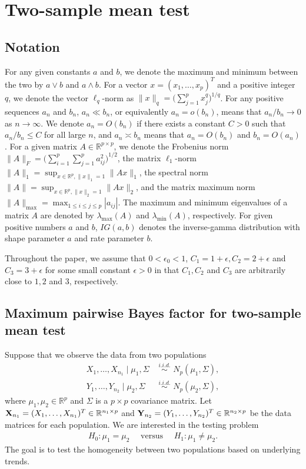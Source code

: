 \documentclass[11pt]{article}
\newcommand{\bean}{\begin{eqnarray}}
\newcommand{\eean}{\end{eqnarray}}
\newcommand{\bfX}{{\bf X}}
\newcommand{\bfY}{{\bf Y}}
\newcommand{\sg}{\Sigma}
\newcommand{\lra}{\longrightarrow}
\newcommand{\bbR}{\mathbb{R}}
\begin{document}
\section{Two-sample mean test}\label{sec:mean}

\subsection{Notation}\label{subsec:notation}

For any given constants $a$ and $b$, we denote the maximum and minimum between the two by $a\vee b$ and $a\wedge b$.
For a vector $x=(x_1,\ldots, x_p)^T$ and a positive integer $q$, we denote the vector $\ell_q$-norm as $\|x\|_q = \big(\sum_{j=1}^p x_j^q \big)^{1/q}$.
For any positive sequences $a_n$ and $b_n$, $a_n\ll b_n$, or equivalently $a_n = o(b_n)$, means that $a_n /b_n \lra 0$ as $n\to\infty$.
We denote $a_n= O(b_n)$ if there exists a constant $C>0$ such that $a_n/b_n \le C$ for all large $n$, and $a_n\asymp b_n$ means that $a_n=O(b_n)$ and $b_n = O(a_n)$.
For a given matrix $A\in \bbR^{p\times p}$, we denote the Frobenius norm $\|A\|_F = \big( \sum_{i=1}^p \sum_{j=1}^p a_{ij}^2 \big)^{1/2}$, the matrix $\ell_1$-norm  $\|A\|_1 = \sup_{x\in \bbR^p , \|x\|_1=1 } \|Ax\|_1$, the spectral norm $\|A\| = \sup_{x\in \bbR^p , \|x\|_2=1 }\|Ax\|_2$, and the matrix maximum norm $\|A\|_{\max} = \max_{1\le i\le j\le p}|a_{ij}| $.
The maximum and minimum eigenvalues of a matrix $A$ are denoted by $\lambda_{\max}(A)$ and $\lambda_{\min}(A)$, respectively.
For given positive numbers $a$ and $b$, $IG(a,b)$ denotes the inverse-gamma distribution with shape parameter $a$ and rate parameter $b$.


Throughout the paper, we assume that $0<\epsilon_0 <1$, $C_1 = 1+\epsilon, C_2 = 2 + \epsilon$ and $C_3= 3 + \epsilon$ for some small constant $\epsilon>0$ in that $C_1, C_2$ and $C_3$ are arbitrarily close to $1,2$ and $3$, respectively.

\subsection{Maximum pairwise Bayes factor for two-sample mean test}\label{subsec:mxPBF_mean}

Suppose that we observe the data from two populations
\begin{equation}
	\begin{split}\label{two_mean}
		X_1,\ldots, X_{n_1} \mid \mu_1, \sg &\,\,\overset{i.i.d.}{\sim}\,\, N_p (\mu_1, \sg) , \\
		Y_1,\ldots, Y_{n_2} \mid \mu_2, \sg &\,\,\overset{i.i.d.}{\sim}\,\, N_p (\mu_2, \sg),
	\end{split}
\end{equation}
where $\mu_1,\mu_2 \in \bbR^p$ and $\sg$ is a $p\times p$ covariance matrix.
Let $\bfX_{n_1} = (X_1,\ldots,X_{n_1})^T \in \bbR^{n_1 \times p}$ and $\bfY_{n_2}=(Y_1,\ldots,Y_{n_2})^T\in \bbR^{n_2 \times p}$ be the data matrices for each population.
We are interested in the testing problem
\bean\label{two_mean_test}
H_0: \mu_1 = \mu_2 \quad\text{ versus }\quad H_1: \mu_1 \neq \mu_2 .
\eean
The goal is to test the homogeneity between two populations based on underlying trends.
\end{document}
